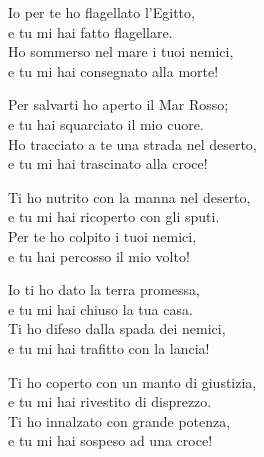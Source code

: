 

\spazio

\strofa Io per te ho flagellato l'Egitto,\\
e tu mi hai fatto flagellare.\\
Ho sommerso nel mare i tuoi nemici,\\
e tu mi hai consegnato alla morte!

\spazio


\spazio

\strofa Per salvarti ho aperto il Mar Rosso;\\
e tu hai squarciato il mio cuore.\\
Ho tracciato a te una strada nel deserto,\\
e tu mi hai trascinato alla croce!

\spazio


\spazio

\strofa Ti ho nutrito con la manna nel deserto,\\
e tu mi hai ricoperto con gli sputi.\\
Per te ho colpito i tuoi nemici,\\
e tu hai percosso il mio volto!

\spazio


\spazio

\strofa Io ti ho dato la terra promessa,\\
e tu mi hai chiuso la tua casa.\\
Ti ho difeso dalla spada dei nemici,\\
e tu mi hai trafitto con la lancia!

\spazio


\spazio

\strofa Ti ho coperto con un manto di giustizia,\\
e tu mi hai rivestito di disprezzo.\\
Ti ho innalzato con grande potenza,\\
e tu mi hai sospeso ad una croce!

\spazio

